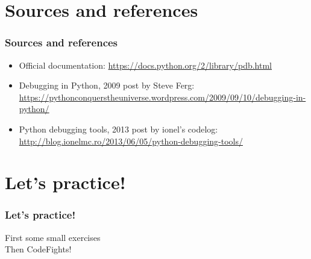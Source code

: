 \section{Sources and references}
\begin{frame}
\frametitle{Sources and references}	
\begin{itemize}
    \item Official documentation: \url{https://docs.python.org/2/library/pdb.html}
    \item Debugging in Python, 2009 post by Steve Ferg: \url{https://pythonconquerstheuniverse.wordpress.com/2009/09/10/debugging-in-python/}
    \item Python debugging tools, 2013 post by ionel's codelog: \url{http://blog.ionelmc.ro/2013/06/05/python-debugging-tools/}
\end{itemize}
\end{frame}





\section{Let's practice!}
\begin{frame}
\frametitle{Let's practice!}	
First some small exercises\\

Then CodeFights!
\end{frame}



\ThankYouFrame

